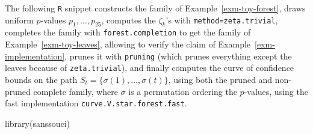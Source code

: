 \documentclass[
  11pt,
  a4paper,
]{article}
\newenvironment{Shaded}{}{}
\newcommand{\FunctionTok}[1]{\textcolor[rgb]{0.44,0.26,0.76}{#1}}
\newcommand{\NormalTok}[1]{\textcolor[rgb]{0.14,0.16,0.18}{#1}}
\theoremstyle{plain}
\theoremstyle{definition}
\theoremstyle{plain}
\theoremstyle{definition}
\theoremstyle{plain}
\theoremstyle{remark}
\begin{document}
The following \texttt{R} snippet constructs the family of
Example~\ref{exm-toy-forest}, draws uniform \(p\)-values
\(p_1,\dotsc,p_{25}\), computes the \(\zeta_k\)'s with
\texttt{method=zeta.trivial}, completes the family with
\texttt{forest.completion} to get the family of
Example~\ref{exm-toy-leaves}, allowing to verify the claim of
Example~\ref{exm-implementation}, prunes it with \texttt{pruning} (which
prunes everything except the leaves because of \texttt{zeta.trivial}),
and finally computes the curve of confidence bounds on the path
\(S_t=\{\sigma(1),\dots,\sigma(t)\}\), using both the pruned and
non-pruned complete family, where \(\sigma\) is a permutation ordering
the \(p\)-values, using the fast implementation
\texttt{curve.V.star.forest.fast}.

\begin{Shaded}
\begin{Highlighting}[]
\FunctionTok{library}\NormalTok{(sanssouci)}


\end{Highlighting}
\end{Shaded}
\end{document}
